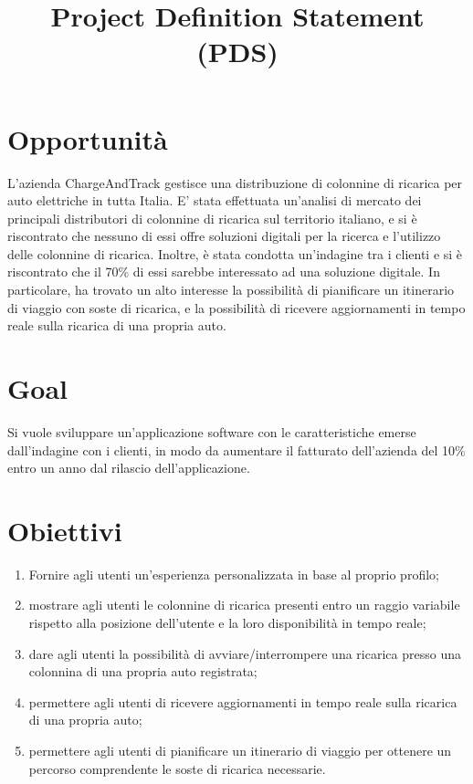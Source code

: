 \documentclass[a4paper,12pt]{article}
\title{\textbf{Project Definition Statement (PDS)}}
\author{}
\date{}
\begin{document}
\maketitle
\tableofcontents

\newpage

\section{Opportunità}
L'azienda ChargeAndTrack gestisce una distribuzione di colonnine di ricarica per auto elettriche in tutta Italia.
E' stata effettuata un'analisi di mercato dei principali distributori di colonnine di ricarica sul territorio
italiano, e si è riscontrato che nessuno di essi offre soluzioni digitali per la ricerca e l'utilizzo delle
colonnine di ricarica. Inoltre, è stata condotta un'indagine tra i clienti e si è riscontrato che il 70\% di essi
sarebbe interessato ad una soluzione digitale. In particolare, ha trovato un alto interesse la possibilità di
pianificare un itinerario di viaggio con soste di ricarica, e la possibilità di ricevere aggiornamenti in tempo reale
sulla ricarica di una propria auto.

\section{Goal}
Si vuole sviluppare un'applicazione software con le caratteristiche emerse dall'indagine con i clienti, in modo da
aumentare il fatturato dell'azienda del 10\% entro un anno dal rilascio dell'applicazione.

\section{Obiettivi}
\begin{enumerate}
    \item Fornire agli utenti un'esperienza personalizzata in base al proprio profilo;
    \item mostrare agli utenti le colonnine di ricarica presenti entro un raggio variabile rispetto alla posizione
    dell'utente e la loro disponibilità in tempo reale;
    \item dare agli utenti la possibilità di avviare/interrompere una ricarica presso una colonnina di una propria auto
    registrata;
    \item permettere agli utenti di ricevere aggiornamenti in tempo reale sulla ricarica di una propria auto;
    \item permettere agli utenti di pianificare un itinerario di viaggio per ottenere un percorso comprendente le soste
    di ricarica necessarie.
\end{enumerate}
\end{document}

